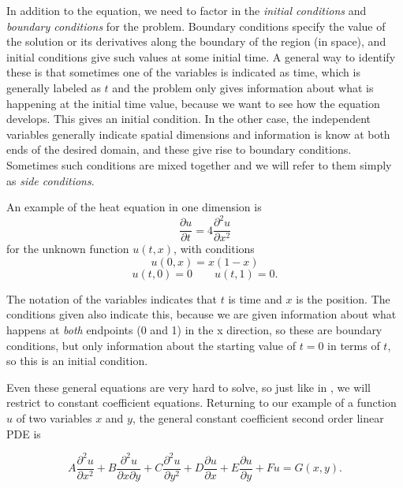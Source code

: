 \documentclass{ximera}
\begin{document}
In addition to the equation, we need to factor in the \emph{initial conditions} and \emph{boundary conditions} for the problem. Boundary conditions specify the value of the solution or its derivatives along the boundary of the region (in space), and initial conditions give such values at some initial time. A general way to identify these is that sometimes one of the variables is indicated as time, which is generally labeled as $t$ and the problem only gives information about what is happening at the initial time value, because we want to see how the equation develops. This gives an initial condition. In the other case, the independent variables generally indicate spatial dimensions and information is know at both ends of the desired domain, and these give rise to boundary conditions. Sometimes such conditions are mixed together and we will refer to them
simply as \emph{side conditions}.

\begin{example}
    An example of the heat equation in one dimension is
    \[ 
        \frac{\partial u}{\partial t} = 4 \frac{\partial^2 u}{\partial x^2} 
    \] 
    for the unknown function $u(t,x)$, with conditions 
    \[ 
        u(0, x) = x(1-x) 
    \]
    \[ 
        u(t,0) = 0 \qquad u(t, 1) = 0. 
    \]
    
    The notation of the variables indicates that $t$ is time and $x$ is the position. The conditions given also indicate this, because we are given information about what happens at \emph{both} endpoints (0 and 1) in the x direction, so these are boundary conditions, but only information about the starting value of $t=0$ in terms of $t$, so this is an initial condition. 
\end{example}

Even these general equations are very hard to solve, so just like in , we will restrict to constant coefficient equations. Returning to our example of a function $u$ of two variables $x$ and $y$, the general constant coefficient second order linear PDE is 

\begin{equation}
    A\frac{\partial^2 u}{\partial x^2} + B\frac{\partial^2u}{\partial x \partial y} + C \frac{\partial ^2 u}{\partial y^2} + D \frac{\partial u}{\partial x} + E \frac{\partial u}{\partial y} + F u = G(x,y).
    \label{eq:solinPDE}
\end{equation}
\end{document}
